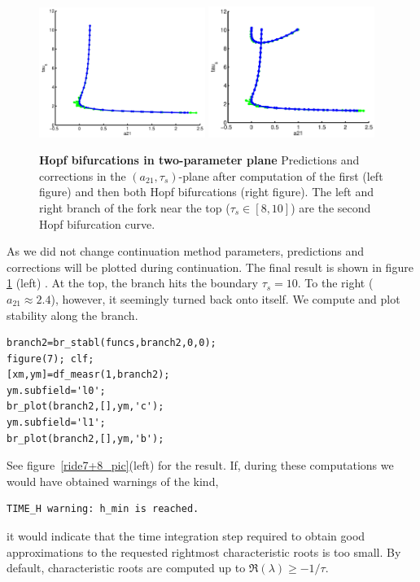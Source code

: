 \documentclass[10pt]{scrartcl}
\begin{document}
\begin{figure}[h]
\begin{center}
  \includegraphics[width=0.48\textwidth]{fig/demo1figa06}
  \includegraphics[width=0.48\textwidth]{fig/demo1fig06}
\end{center}
\caption{\label{ride6_pic} \textbf{\textsf{Hopf bifurcations in
      two-parameter plane}} Predictions and corrections in the
  $(a_{21},\tau_s)$-plane after computation of the first (left figure)
  and then both Hopf bifurcations (right figure).  The left and right
  branch of the fork near the top ($\tau_s\in[8,10]$) are the second
  Hopf bifurcation curve.}
\end{figure}
As we did not change continuation method parameters, predictions and
corrections will be plotted during continuation.  The final result is
shown in figure \ref{ride6_pic} (left) .  At the top, the branch hits the
boundary $\tau_s=10$. To the right ($a_{21}\approx2.4$), however, it
seemingly turned back onto itself.  We compute and plot stability
along the branch.
\begin{lstlisting}
branch2=br_stabl(funcs,branch2,0,0);
figure(7); clf;
[xm,ym]=df_measr(1,branch2);
ym.subfield='l0';
br_plot(branch2,[],ym,'c');
ym.subfield='l1';
br_plot(branch2,[],ym,'b');  
\end{lstlisting}
See figure~\ref{ride7+8_pic}(left) for the result. If, during these
computations we would have obtained warnings of the kind, 
{\small
\begin{verbatim}
TIME_H warning: h_min is reached.
\end{verbatim}}
\noindent it would indicate that the time integration step required to obtain good
approximations to the requested rightmost characteristic roots 
is too small.
By default, characteristic roots are computed 
up to $\Re(\lambda)\geq-1/\tau$.
\end{document}
